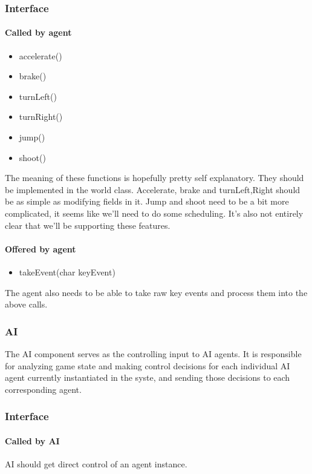 \documentclass[12pt]{article}
\begin{document}
\subsubsection{Interface}

\paragraph{Called by agent}
\begin{itemize}
\item accelerate()
\item brake()
\item turnLeft()
\item turnRight()
\item jump()
\item shoot()
\end{itemize}
The meaning of these functions is hopefully pretty self explanatory. They should be implemented in the world class. Accelerate, brake and turn{Left,Right} should be as simple as modifying fields in it.
Jump and shoot need to be a bit more complicated, it seems like we'll need to do some scheduling. It's also not entirely clear that we'll be supporting these features.

\paragraph{Offered by agent}
\begin{itemize}
\item takeEvent(char keyEvent)
\end{itemize}
The agent also needs to be able to take raw key events and process them into the above calls.

\subsubsection{AI}
The AI component serves as the controlling input to AI agents. It is responsible
for analyzing game state and making control decisions for each individual AI
agent currently instantiated in the syste, and sending those decisions to
each corresponding agent.

\subsubsection{Interface}

\paragraph{Called by AI}
AI should get direct control of an agent instance.
\end{document}
